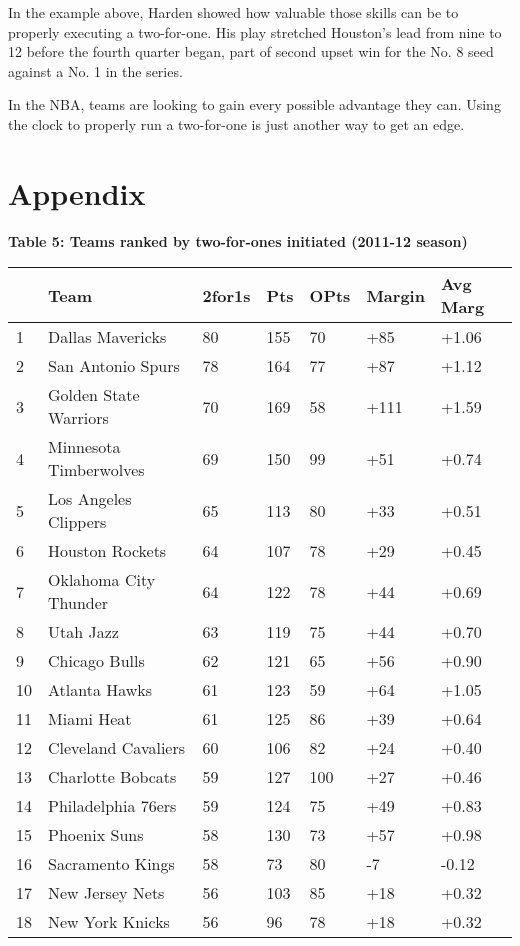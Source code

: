 \documentclass{article}
\begin{document}
In the example above, Harden showed how valuable those skills can be to properly executing a two-for-one. His play stretched Houston's lead from nine to 12 before the fourth quarter began, part of second upset win for the No. 8 seed against a No. 1 in the series.

In the NBA, teams are looking to gain every possible advantage they can. Using the clock to properly run a two-for-one is just another way to get an edge.

\section*{Appendix}

\textbf{Table 5: Teams ranked by two-for-ones initiated (2011-12 season)}
\begin{tabular}{|l|l|l|l|l|l|l|}
\hline
& Team & 2for1s & Pts & OPts & Margin & Avg Marg \\ 
\hline
1 & Dallas Mavericks & 80 & 155 & 70 & +85 & +1.06 \\
2 & San Antonio Spurs & 78 & 164 & 77 & +87 & +1.12 \\
3 & Golden State Warriors & 70 & 169 & 58 & +111 & +1.59 \\
4 & Minnesota Timberwolves & 69 & 150 & 99 & +51 & +0.74 \\
5 & Los Angeles Clippers & 65 & 113 & 80 & +33 & +0.51 \\
6 & Houston Rockets & 64 & 107 & 78 & +29 & +0.45 \\
7 & Oklahoma City Thunder & 64 & 122 & 78 & +44 & +0.69 \\
8 & Utah Jazz & 63 & 119 & 75 & +44 & +0.70 \\
9 & Chicago Bulls & 62 & 121 & 65 & +56 & +0.90 \\
10 & Atlanta Hawks & 61 & 123 & 59 & +64 & +1.05 \\
11 & Miami Heat & 61 & 125 & 86 & +39 & +0.64 \\
12 & Cleveland Cavaliers & 60 & 106 & 82 & +24 & +0.40 \\
13 & Charlotte Bobcats & 59 & 127 & 100 & +27 & +0.46 \\
14 & Philadelphia 76ers & 59 & 124 & 75 & +49 & +0.83 \\
15 & Phoenix Suns & 58 & 130 & 73 & +57 & +0.98 \\
16 & Sacramento Kings & 58 & 73 & 80 & -7 & -0.12 \\
17 & New Jersey Nets & 56 & 103 & 85 & +18 & +0.32 \\
18 & New York Knicks & 56 & 96 & 78 & +18 & +0.32 \\

\end{tabular}
\end{document}
